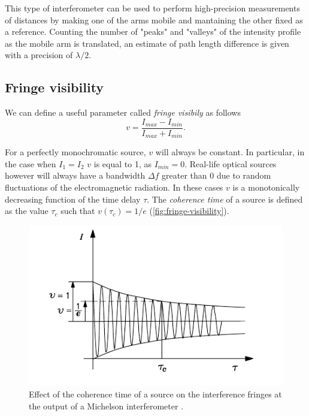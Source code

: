 This type of interferometer can be used to perform high-precision measurements of distances by making one of the arms mobile and mantaining the other fixed as a reference. Counting the number of "peaks" and "valleys" of the intensity profile as the mobile arm is translated, an estimate of path length difference is given with a precision of $\lambda/2$. \\


\subsection{Fringe visibility}

\noindent We can define a useful parameter called \emph{fringe visibily} as follows
\begin{equation}
\label{eq:fringevisibily}
v = \frac{I_{max} - I_{min}}{I_{max} + I_{min}}.
\end{equation}


For a perfectly monochromatic source, $v$ will always be constant. In particular, in the case when $I_1 = I_2$  $v$ is equal to 1, as $I_{min} = 0$. Real-life optical sources however will always have a bandwidth $\Delta f$ greater than 0 due to random fluctuations of the electromagnetic radiation. In these cases $v$ is a monotonically decreasing function of the time delay $\tau$.  The \emph{coherence time} of a source is defined as the value $\tau_c$ such that $v(\tau_c) = 1/e$ (\autoref{fig:fringe-visibility}). 




\begin{figure}[hbt]
	\myfloatalign
	\includegraphics[width=0.8\linewidth]{gfx/fringe-visibility}
	\caption{Effect of the coherence time of a source on the interference fringes at the output of a Michelson interferometer \cite{Someda2006}.}\label{fig:fringe-visibility}
\end{figure}


